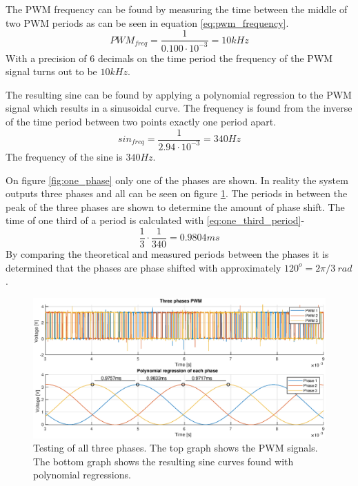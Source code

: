 The PWM frequency can be found by measuring the time between the middle of two PWM periods as can be seen in equation \ref{eq:pwm_frequency}. 
\begin{equation}
    PWM_{freq} = \frac{1}{0.100 \cdot 10^{-3}} = 10kHz
    \label{eq:pwm_frequency}
\end{equation}
With a precision of 6 decimals on the time period the frequency of the PWM signal turns out to be $10kHz$.

The resulting sine can be found by applying a polynomial regression to the PWM signal which results in a sinusoidal curve. The frequency is found from the inverse of the time period between two points exactly one period apart. 
\begin{equation}
    sin_{freq} = \frac{1}{2.94 \cdot 10^{-3}} = 340 Hz
\end{equation}
The frequency of the sine is $340Hz$.

On figure \ref{fig:one_phase} only one of the phases are shown. In reality the system outputs three phases and all can be seen on figure \ref{fig:three_phases}. The periods in between the peak of the three phases are shown to determine the amount of phase shift. The time of one third of a period is calculated with \ref{eq:one_third_period}-
\begin{equation}
    \frac{1}{3} \cdot \frac{1}{340} = 0.9804ms
    \label{eq:one_third_period}
\end{equation}
By comparing the theoretical and measured periods between the phases it is determined that the phases are phase shifted with approximately $120^o = 2 \pi / 3 \ rad$.
\begin{figure}[H]
	\centering
	\includegraphics[width=1 \textwidth]{pictures/software/three_phases.eps}
	\caption{Testing of all three phases. The top graph shows the PWM signals. The bottom graph shows the resulting sine curves found with polynomial regressions.}
	\label{fig:three_phases}
\end{figure}

